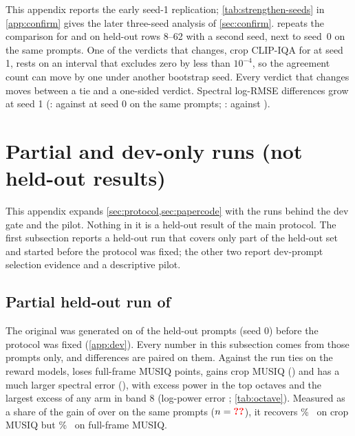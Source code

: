 This appendix reports the early seed-1 replication; \cref{tab:strengthen-seeds} in \cref{app:confirm} gives the later three-seed analysis of \cref{sec:confirm}.  repeats the comparison for \tempsb{} and \constancytm{} on held-out rows 8--62 with a second seed, next to seed~0 on the same  prompts. One of the verdicts that changes, crop CLIP-IQA for \tempsb{} at seed 1, rests on an interval that excludes zero by less than $10^{-4}$, so the agreement count can move by one under another bootstrap seed. Every verdict that changes moves between a tie and a one-sided verdict. Spectral log-RMSE differences grow at seed 1 (\tempsb:  against  at seed 0 on the same prompts; \constancytm:  against ).

\begin{table}[!htbp]
\centering
\caption{\textbf{Seed 1 repeats most nominal seed-0 verdicts.} Paired differences against \segaofficial{} on the same  held-out prompts (rows 8--62) at seed 0 and at seed 1.  of  nominal verdicts agree. Intervals and direction triangles use the nominal 95\% convention of \cref{tab:main}; this descriptive table has no Holm adjustment.}
\label{tab:seed1}
\scriptsize
\setlength{\tabcolsep}{4pt}

\end{table}

\section{Partial and dev-only runs (not held-out results)}\label{app:partial}

This appendix expands \cref{sec:protocol,sec:papercode} with the runs behind the dev gate and the pilot. Nothing in it is a held-out result of the main protocol. The first subsection reports a held-out run that covers only part of the held-out set and started before the protocol was fixed; the other two report dev-prompt selection evidence and a descriptive pilot.

\subsection{Partial held-out run of \constancy}

The original \constancy{} was generated on  of the  held-out prompts (seed 0) before the protocol was fixed (\cref{app:dev}). Every number in this subsection comes from those  prompts only, and differences are paired on them. Against \segaofficial{} the run ties on the reward models, loses  full-frame MUSIQ points, gains crop MUSIQ () and has a much larger spectral error (), with excess power in the top octaves and the largest excess of any arm in band 8 (log-power error ; \cref{tab:octave}). Measured as a share of the gain of \segaofficial{} over \ntk{} on the same prompts ($n=\N{shx@n@cons}$), it recovers \%~ on crop MUSIQ but \%~ on full-frame MUSIQ.

